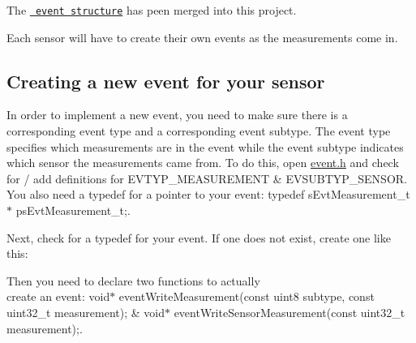 The \href{https://code.fbi.h-da.de/pse_mayer_ss19/trunk/tree/master/Allgemein/Beispiele/CY8Ckit-149-BLE/I2C_Event.cydsn}{\texttt{ event structure}} has peen merged into this project.

Each sensor will have to create their own events as the measurements come in.

\subsection*{Creating a new event for your sensor}

In order to implement a new event, you need to make sure there is a corresponding event type and a corresponding event subtype. The event type specifies which measurements are in the event while the event subtype indicates which sensor the measurements came from. To do this, open {\ttfamily \mbox{\hyperlink{event_8h_source}{event.\+h}}} and check for / add definitions for {\ttfamily E\+V\+T\+Y\+P\+\_\+\+M\+E\+A\+S\+U\+R\+E\+M\+E\+NT} \& {\ttfamily E\+V\+S\+U\+B\+T\+Y\+P\+\_\+\+S\+E\+N\+S\+OR}. You also need a {\ttfamily typedef} for a pointer to your event\+: {\ttfamily typedef s\+Evt\+Measurement\+\_\+t$\ast$ ps\+Evt\+Measurement\+\_\+t;}.

Next, check for a {\ttfamily typedef} for your event. If one does not exist, create one like this\+:


\begin{DoxyCode}{0}
\end{DoxyCode}


Then you need to declare two functions to actually\\ create an event\+: {\ttfamily void$\ast$ event\+Write\+Measurement(const uint8 subtype, const uint32\+\_\+t measurement);} \& {\ttfamily void$\ast$ event\+Write\+Sensor\+Measurement(const uint32\+\_\+t measurement);}.

